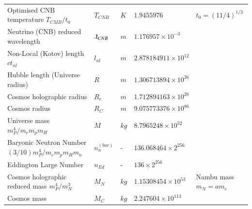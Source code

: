 \documentclass[a4paper,9pt]{article}
\begin{document}
\begin{table}
\begin{tabular}{lllll}
   
   
   Optimised CNB temperature $T_{CMB}/t_0 $ & $T_{CNB}$ &$ K$ & $1.9455976$ & $t_0 = (11/4)^{1/3}$ \cite{Zyla}   \\
   
   Neutrino (CNB) reduced wavelength & $\lambdabar_{CNB} $ & $m$ & $1.176957 \times 10^{-3} $ & \\
   
   Non-Local (Kotov) length $ct_{nl} $& $l_{nl}$ & $m$ & $2.878184911 \times 10^{12} $ & \cite{Sanchez2} \\ 
   
    Hubble length (Universe radius) & $R$ &$ m$ & $1.306713894 \times 10^{26} $ & \cite{Sanchez2} \\ 
   Cosmos holographic radius & $R_e$ & $m$ & $1.712894163 \times 10^{26} $ & \cite{Sanchez2} \\
   Cosmos radius & $ R_C$ &$m$ & $9.075773376 \times 10^{86} $ & \cite{Sanchez2} \\
   Universe mass $m_P^4/m_em_pm_H$ & $M$ &$ kg$ & $8.7965248 \times 10^{52} $ & \cite{Sanchez2} \\
   
   Baryonic Neutron Number  $(3/10)m_P^4/m_em_pm_Hm_n$ & $n^{(bar)}_n$ & - &$\underline{136.068464\times 2^{256}}$ & \cite{Sanchez2}  \\
   
   Eddington Large Number & $n_{Ed}$    & - & $\underline{136\times 2^{256}}$& \cite{Eddington} \\
   
   Cosmos holographic reduced mass $m_P^4/m_N^3$ & $M_N$ & $kg$ & $1.15308454 \times 10^{53} $ & \cite{Sanchez2} Nambu mass $m_N = am_e$ \\
 
   Cosmos mass & $M_C$ & $kg$ & $2.247604 \times 10^{113} $ & \cite{Sanchez2} \\ 
   

    \bottomrule
  \end{tabular}
\end{table}



%
    
\end{document}
